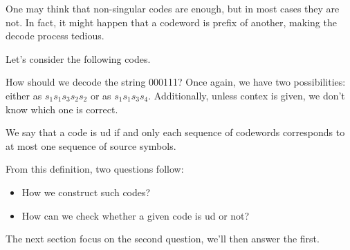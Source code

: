 \documentclass{subfiles}
\begin{document}
    One may think that non-singular codes are enough, 
        but in most cases they are not.
    In fact, it might happen that a codeword is prefix of another,
        making the decode process tedious.
    \begin{example*}
        Let's consider the following codes.
        
        How should we decode the string 000111? 
        Once again, we have two possibilities:
            either as \(s_{1}s_{1}s_{3}s_{2}s_{2}\) or as \(s_{1}s_{1}s_{3}s_{4}\).
        Additionally, unless contex is given, we don't know which one is correct.
    \end{example*}
    We say that a code is \gls{ud} if and only each sequence of codewords
        corresponds to at most one sequence of source symbols.
    
    From this definition, two questions follow:
    \begin{itemize}
        \item How we construct such codes?
        \item How can we check whether a given code is \gls{ud} or not?
    \end{itemize}

    The next section focus on the second question, we'll then answer the first.
\end{document}
